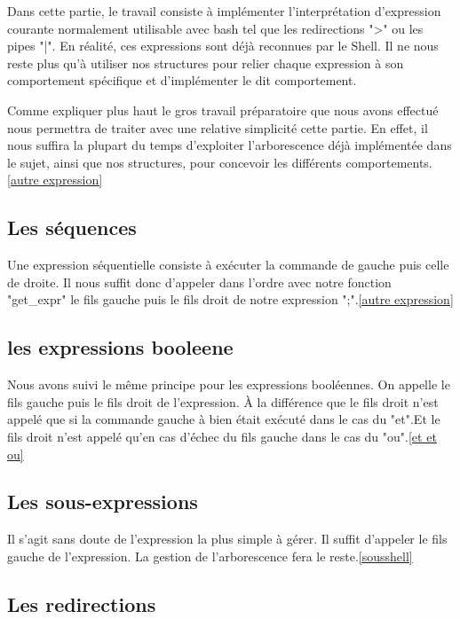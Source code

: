 \documentclass[12pt]{article}
\begin{document}
Dans cette partie, le travail consiste à implémenter l'interprétation d'expression courante
normalement utilisable avec bash tel que les redirections ">" ou les pipes "|".
En réalité, ces expressions sont déjà reconnues par le Shell. Il ne nous reste plus qu'à utiliser
nos structures pour relier chaque expression à son comportement spécifique et d'implémenter le
dit comportement.

Comme expliquer plus haut le gros travail préparatoire que nous avons effectué nous permettra
de traiter avec une relative simplicité cette partie. En effet, il nous suffira la plupart du temps 
d'exploiter l'arborescence déjà implémentée dans le sujet, ainsi que nos structures, pour concevoir
les différents comportements.\ref{autre expression}

\subsection{Les séquences}

Une expression séquentielle consiste à exécuter la commande de gauche puis celle de droite.
Il nous suffit donc d'appeler dans l'ordre avec notre fonction "get\_expr" le fils gauche puis le fils
droit de notre expression ";".\ref{autre expression}

\subsection{les expressions booleene}

Nous avons suivi le même principe pour les expressions booléennes. On appelle le fils gauche puis
le fils droit de l'expression.
À la différence que le fils droit n'est appelé que si la commande gauche à bien était exécuté dans le
cas du "et".Et le fils droit n'est appelé qu’en cas d'échec du fils gauche dans le cas du "ou".\ref{et et ou}

\subsection{Les sous-expressions}

Il s'agit sans doute de l'expression la plus simple à gérer. Il suffit d'appeler le fils
gauche de l'expression. La gestion de l'arborescence fera le reste.\ref{sousshell}

\subsection{Les redirections}
\end{document}
